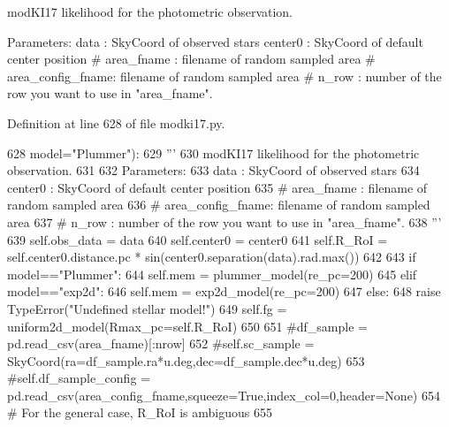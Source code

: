 \begin{DoxyVerb}modKI17 likelihood for the photometric observation.

Parameters:
    data       : SkyCoord of observed stars
    center0    : SkyCoord of default center position
    # area_fname : filename of random sampled area
    # area_config_fname: filename of random sampled area
    # n_row      : number of the row you want to use in "area_fname".
\end{DoxyVerb}
 

Definition at line 628 of file modki17.\+py.


\begin{DoxyCode}
628                  model=\textcolor{stringliteral}{"Plummer"}):
629         \textcolor{stringliteral}{'''}
630 \textcolor{stringliteral}{        modKI17 likelihood for the photometric observation.}
631 \textcolor{stringliteral}{        }
632 \textcolor{stringliteral}{        Parameters:}
633 \textcolor{stringliteral}{            data       : SkyCoord of observed stars}
634 \textcolor{stringliteral}{            center0    : SkyCoord of default center position}
635 \textcolor{stringliteral}{            # area\_fname : filename of random sampled area}
636 \textcolor{stringliteral}{            # area\_config\_fname: filename of random sampled area}
637 \textcolor{stringliteral}{            # n\_row      : number of the row you want to use in "area\_fname".}
638 \textcolor{stringliteral}{        '''}
639         self.obs\_data = data
640         self.center0 = center0
641         self.R\_RoI = self.center0.distance.pc * sin(center0.separation(data).rad.max())
642         
643         \textcolor{keywordflow}{if} model==\textcolor{stringliteral}{"Plummer"}:
644             self.mem = plummer\_model(re\_pc=200)
645         \textcolor{keywordflow}{elif} model==\textcolor{stringliteral}{"exp2d"}:
646             self.mem = exp2d\_model(re\_pc=200)
647         \textcolor{keywordflow}{else}: 
648             \textcolor{keywordflow}{raise} TypeError(\textcolor{stringliteral}{"Undefined stellar model!"})
649         self.fg = uniform2d\_model(Rmax\_pc=self.R\_RoI)
650         
651         \textcolor{comment}{#df\_sample = pd.read\_csv(area\_fname)[:nrow]}
652         \textcolor{comment}{#self.sc\_sample = SkyCoord(ra=df\_sample.ra*u.deg,dec=df\_sample.dec*u.deg)}
653         \textcolor{comment}{#self.df\_sample\_config  = pd.read\_csv(area\_config\_fname,squeeze=True,index\_col=0,header=None)}
654         \textcolor{comment}{# For the general case, R\_RoI is ambiguous}
655     
\end{DoxyCode}



